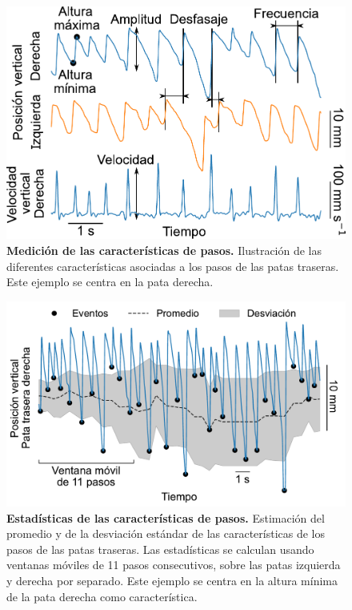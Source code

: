\begin{figure}[htbp]
    \centering
    \includegraphics[width=0.65\linewidth]{figuras/capitulo2/caracteristicas_de_pasos.pdf}
    \caption{\textbf{Medición de las características de pasos.}
        Ilustración de las diferentes características asociadas a los pasos de las patas traseras.
        Este ejemplo se centra en la pata derecha.}
    \label{fig:capitulo2_caracteristicas_de_pasos}
\end{figure}

\begin{figure}[htbp]
    \centering
    \includegraphics[width=0.8\linewidth]{figuras/capitulo2/estadistica_de_pasos.pdf}
    \caption{\textbf{Estadísticas de las características de pasos.}
        Estimación del promedio y de la desviación estándar de las características de los pasos de las patas traseras.
        Las estadísticas se calculan usando ventanas móviles de 11 pasos consecutivos, sobre las patas izquierda y derecha por separado.
        Este ejemplo se centra en la altura mínima de la pata derecha como característica.}
    \label{fig:capitulo2_estadistica_de_pasos}
\end{figure}